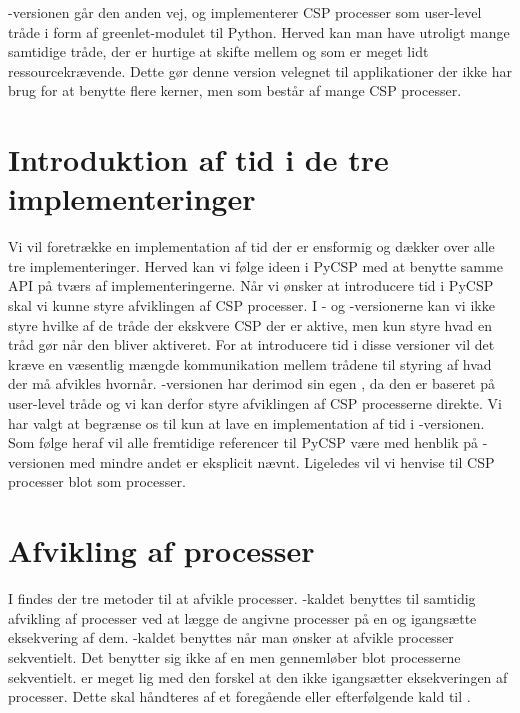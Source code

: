 -versionen går den anden vej, og implementerer CSP processer som user-level tråde i form af greenlet-modulet til Python\cite{greenlet}. Herved kan man have utroligt mange samtidige tråde, der er hurtige at skifte mellem og som er meget lidt ressourcekrævende. Dette gør denne version velegnet til applikationer der ikke har brug for at benytte flere kerner, men som består af mange CSP processer. 

\section{Introduktion af tid i de tre implementeringer}
Vi vil foretrække en implementation af tid der er ensformig og dækker over alle tre implementeringer. Herved kan vi følge ideen i PyCSP med at benytte samme API på tværs af implementeringerne. Når vi ønsker at introducere tid i PyCSP skal vi kunne styre afviklingen af CSP processer. I  - og -versionerne kan vi ikke styre hvilke af de tråde der ekskvere CSP der er aktive, men kun styre hvad en tråd gør når den bliver aktiveret. For at introducere tid i disse versioner vil det kræve en væsentlig mængde kommunikation mellem trådene til styring af hvad der må afvikles hvornår. -versionen har derimod sin egen \sched , da den er baseret på user-level tråde og vi kan derfor styre afviklingen af CSP processerne direkte. Vi har valgt at begrænse os til kun at lave en implementation af tid i -versionen. Som følge heraf vil alle fremtidige referencer til PyCSP være med henblik på -versionen med mindre andet er eksplicit nævnt. Ligeledes vil vi henvise til CSP processer blot som processer. 

\section{Afvikling af processer}
I \pycsp findes der tre metoder til at afvikle processer. -kaldet benyttes til samtidig afvikling af processer ved at lægge de angivne processer på \sched en og igangsætte eksekvering af dem. -kaldet benyttes når man ønsker at afvikle processer sekventielt. Det benytter sig ikke af \sched en men gennemløber blot processerne sekventielt.  er meget lig  med den forskel at den ikke igangsætter eksekveringen af processer. Dette skal håndteres af et foregående eller efterfølgende kald til . 


